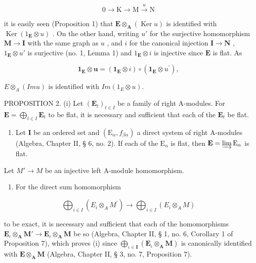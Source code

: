 \[
0 \longrightarrow \mathrm{K} \longrightarrow \mathrm{M} \stackrel {u} {\longrightarrow} \mathrm{N}
\]

it is easily seen (Proposition 1) that \(\mathbf{E} \otimes_{\mathbf{A}} (\operatorname{Ker} u)\) is identified with \(\operatorname{Ker}(1_{\mathbf{E}} \otimes u)\) . On the other hand, writing \(u'\) for the surjective homomorphism \(\mathbf{M} \to \mathbf{I}\) with the same graph as \(u\) , and \(i\) for the canonical injection \(\mathbf{I} \to \mathbf{N}\) , \(1_{\mathbf{E}} \otimes u'\) is surjective (no. 1, Lemma 1) and \(1_{\mathbf{E}} \otimes i\) is injective since \(\mathbf{E}\) is flat. As

\[
\mathbf {1} _ {\mathbf {E}} \otimes \boldsymbol {u} = (\mathbf {1} _ {\mathbf {E}} \otimes i) \circ (\mathbf {1} _ {\mathbf {E}} \otimes u ^ {\prime}),
\]

\(E \otimes_{A} (Im u) \text{ is identified with } Im(1_{E} \otimes u).\)

PROPOSITION 2. (i) Let \((\mathbf{E}_t)_{t \in I}\) be a family of right A-modules. For \(\mathbf{E} = \bigoplus_{t \in I} \mathbf{E}_t\) to be flat, it is necessary and sufficient that each of the \(\mathbf{E}_t\) be flat.

\begin{enumerate}
\def\labelenumi{(\roman{enumi})}
\setcounter{enumi}{1}
\tightlist
\item
  Let \(\mathbf{I}\) be an ordered set and \((\mathrm{E}_{\alpha}, f_{\beta \alpha})\) a direct system of right A-modules (Algebra, Chapter II, § 6, no. 2). If each of the \(\mathrm{E}_{\alpha}\) is flat, then \(\mathbf{E} = \varinjlim \mathrm{E}_{\alpha}\) is flat.
\end{enumerate}

Let \(M' \to M\) be an injective left A-module homomorphism.

\begin{enumerate}
\def\labelenumi{(\roman{enumi})}
\tightlist
\item
  For the direct sum homomorphism
\end{enumerate}

\[
\bigoplus_ {i \in I} \left(E _ {i} \otimes_ {A} M ^ {\prime}\right)\rightarrow \bigoplus_ {i \in I} \left(E _ {i} \otimes_ {A} M\right)
\]

to be exact, it is necessary and sufficient that each of the homomorphisms \(\mathbf{E}_{\iota} \otimes_{\mathbf{A}} \mathbf{M}' \to \mathbf{E}_{\iota} \otimes_{\mathbf{A}} \mathbf{M}\) be so (Algebra, Chapter II, § 1, no. 6, Corollary 1 of Proposition 7), which proves (i) since \(\bigoplus_{\iota \in \mathbf{I}} (\mathbf{E}_{\iota} \otimes_{\mathbf{A}} \mathbf{M})\) is canonically identified with \(\mathbf{E} \otimes_{\mathbf{A}} \mathbf{M}\) (Algebra, Chapter II, § 3, no. 7, Proposition 7).


